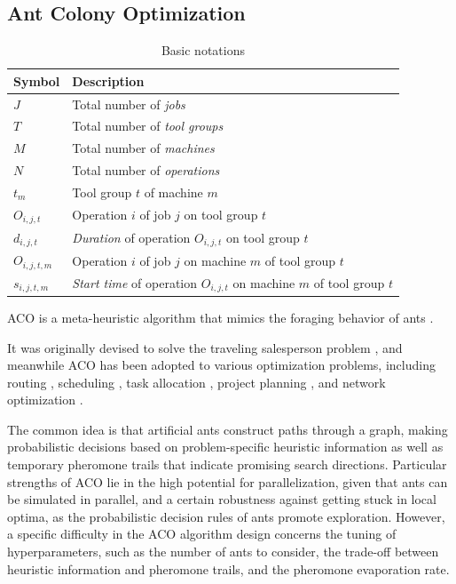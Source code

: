 \documentclass[runningheads]{llncs}
\begin{document}
\subsection{Ant Colony Optimization}
\label{sec:aco}

\begin{table}[t]
\caption{Basic notations}\label{notations} \centering
\begin{tabular}{ll}
	\hline
	Symbol & Description \\ \hline
	$J$ & Total number of \emph{jobs}        \\
	$T$ & Total number of \emph{tool groups} \\
	$M$ & Total number of \emph{machines}    \\
	$N$ & Total number of \emph{operations} \\
	$t_{m}$ & Tool group $t$ of machine $m$ \\
	$O_{i,j,t}$ & Operation $i$ of job $j$ on tool group $t$  \\
	$d_{i,j,t}$ & \emph{Duration} of operation $O_{i,j,t}$ on tool group $t$ \\
	$O_{i,j,t,m}$ & Operation $i$ of job $j$ on machine $m$ of tool group $t$  \\
	$s_{i,j,t,m}$ & \emph{Start time} of operation $O_{i,j,t}$ on machine $m$ of tool group $t$  \\
	\hline
\end{tabular}
\end{table}

ACO is a
meta-heuristic algorithm that mimics the foraging behavior of ants \cite{dorigo2019ant}.

It was originally devised to solve the traveling salesperson problem \cite{stutzle1999aco},
and meanwhile ACO has been adopted to various optimization problems, including routing \cite{rizzoli2007ant}, scheduling \cite{luo2008ant}, task allocation \cite{rugwiro2019task}, project planning \cite{khelifa2020holonic}, and network optimization \cite{wang2009hopnet}.

The common idea is that artificial ants construct paths through a graph,
making probabilistic decisions based on problem-specific heuristic information as well as temporary pheromone trails that indicate
promising search directions.
Particular strengths of ACO lie in the high potential for parallelization,
given that ants can be simulated in parallel,
and a certain robustness against getting stuck in local optima,
as the probabilistic decision rules of ants promote exploration.
However, a specific difficulty in the ACO algorithm design concerns the
tuning of hyperparameters, such as the number of ants to consider,
the trade-off between heuristic information and pheromone trails, and
the pheromone evaporation rate. 
\end{document}

